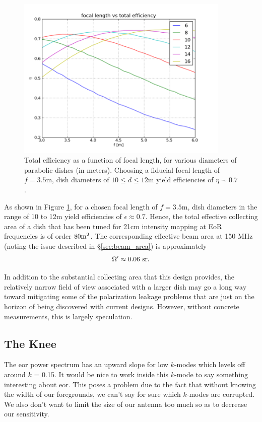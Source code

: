 \documentclass[11pt]{article}
\begin{document}
\begin{figure}
\centering
\includegraphics[width=4in]{dish_plots/focal_len_vs_eff.png}
\caption{Total efficiency as a function of focal length, for various diameters
of parabolic dishes (in meters).  Choosing a fiducial focal length of $f=3.5$m,
dish diameters of $10\le d\le 12$m yield efficiencies of $\eta\sim0.7$.}
\label{fig:focal_len_vs_eff}
\end{figure}

As shown in Figure \ref{fig:focal_len_vs_eff}, for a chosen focal length of
$f=3.5$m, dish diameters in the range of 10 to 12m yield efficiencies of
$\epsilon\approx0.7$.  Hence, the total effective collecting area of a dish that
has been tuned for 21cm intensity mapping at EoR frequencies is of order $80{\rm
m}^2$.  The corresponding effective beam area at 150 MHz 
(noting the issue described in \S\ref{sec:beam_area}) is approximately
\begin{equation}
\Omega^\prime\approx0.06\ {\rm sr}.
\end{equation}

In addition to the substantial collecting area that this design provides, the
relatively narrow field of view associated with a larger dish may go a long way
toward mitigating some of the polarization leakage problems that are just on the
horizon of being discovered with current designs.  However, without concrete
measurements, this is largely speculation.


\subsection{The Knee}
The eor power spectrum has an upward slope for low $k$-modes which levels off
around $k$ = 0.15. It would be nice to work inside this $k$-mode to say
something interesting about eor. This poses a problem due to the fact that
without knowing the width of our foregrounds, we can't say for sure which
$k$-modes are corrupted. We also don't want to limit the size of our antenna too
much so as to decrease our sensitivity. 
\end{document}

